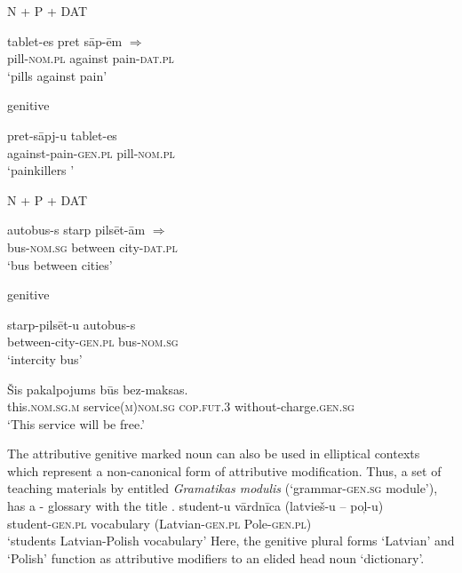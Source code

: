 \documentclass[output=paper,colorlinks,citecolor=brown]{langscibook}
\begin{document}
\largerpage
\ea\label{tabletes}
\begin{xlist}
	\ex\label{pretsapem} 
	N + P + DAT
	
	\gll	tablet-es pret sāp-ēm 	\hspace{5em}	\hfill $\Rightarrow$	\\
	pill-\textsc{nom.pl} against pain-\textsc{dat.pl}				\\
	\glt	‘pills against pain’
	
	\ex 
	\label{pretsapju}
	 genitive
	
	\gll	pret-sāpj-u tablet-es				\\
	against-pain-\textsc{gen.pl} pill-\textsc{nom.pl}	\\
	\glt	‘painkillers ’ 
	
\end{xlist}

\ex\label{pilseta}
\begin{xlist}
	\ex 
	\label{starppilsetam}
	N + P + DAT
	
	\gll	autobus-s starp pilsēt-ām 	\hspace{5em}	\hfill $\Rightarrow$	\\
	bus-\textsc{nom.sg} between city-\textsc{dat.pl}	\\
	\glt	‘bus between cities’ 
	
	
	\ex 
	\label{starppilsetu}
	 genitive
	
	\gll	starp-pilsēt-u autobus-s				\\
	between-city-\textsc{gen.pl} bus-\textsc{nom.sg}			\\
	\glt	‘intercity bus’ 
	
\end{xlist}
\z

\ea
\label{bezmaksas}
\gll	 Šis 				pakalpojums 					būs				bez-maksas.		\\
this.\textsc{nom.sg.m} 	service(\textsc{m})\textsc{nom.sg} 	\textsc{cop.fut.3} 	without-charge.\textsc{gen.sg}	\\
\glt			‘This service will be free.’ \hfill \citep[178]{kalnacalokmane2016}

\z

The attributive genitive marked noun can also be used in elliptical contexts which represent a non-canonical form of attributive modification. Thus, a set of teaching materials by  \citet{nau2008} entitled \emph{Gramatikas modulis} (`grammar-\textsc{gen.sg} module'), has a - glossary with the title . 
\ea\label{vardnica}
\gll	student-u vārdnīca (latvieš-u – pol̦-u)		\\
student-\textsc{gen.pl}	vocabulary	(Latvian-\textsc{gen.pl} {} Pole-\textsc{gen.pl})	\\
\glt		`students Latvian-Polish vocabulary'
\z
Here, the genitive plural forms  `Latvian' and  `Polish' function as attributive modifiers to an elided head noun  `dictionary'.
\end{document}
